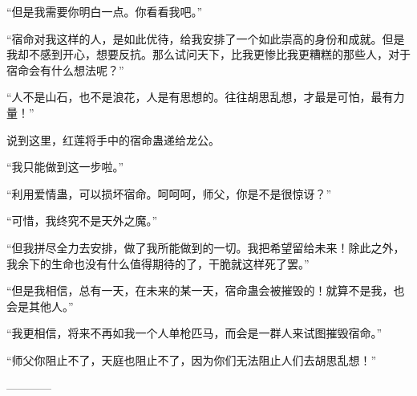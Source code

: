 \begin{this_body}
“但是我需要你明白一点。你看看我吧。”

“宿命对我这样的人，是如此优待，给我安排了一个如此崇高的身份和成就。但是我却不感到开心，想要反抗。那么试问天下，比我更惨比我更糟糕的那些人，对于宿命会有什么想法呢？”

“人不是山石，也不是浪花，人是有思想的。往往胡思乱想，才最是可怕，最有力量！”

说到这里，红莲将手中的宿命蛊递给龙公。

“我只能做到这一步啦。”

“利用爱情蛊，可以损坏宿命。呵呵呵，师父，你是不是很惊讶？”

“可惜，我终究不是天外之魔。”

“但我拼尽全力去安排，做了我所能做到的一切。我把希望留给未来！除此之外，我余下的生命也没有什么值得期待的了，干脆就这样死了罢。”

“但是我相信，总有一天，在未来的某一天，宿命蛊会被摧毁的！就算不是我，也会是其他人。”

“我更相信，将来不再如我一个人单枪匹马，而会是一群人来试图摧毁宿命。”

“师父你阻止不了，天庭也阻止不了，因为你们无法阻止人们去胡思乱想！”

------------

\end{this_body}

